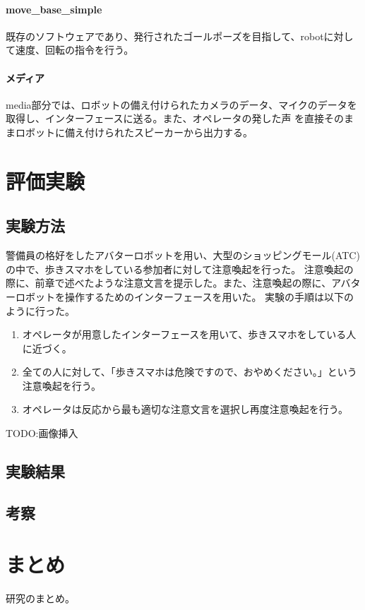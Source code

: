 \documentclass[11pt,a4j]{jreport}
\begin{document}
\subsubsection{move\_base\_simple}
既存のソフトウェアであり、発行されたゴールポーズを目指して、robotに対して速度、回転の指令を行う。

\subsubsection{メディア}
media部分では、ロボットの備え付けられたカメラのデータ、マイクのデータを取得し、インターフェースに送る。また、オペレータの発した声
を直接そのままロボットに備え付けられたスピーカーから出力する。


\chapter{評価実験}
\section{実験方法}
警備員の格好をしたアバターロボットを用い、大型のショッピングモール(ATC)の中で、歩きスマホをしている参加者に対して注意喚起を行った。
注意喚起の際に、前章で述べたような注意文言を提示した。また、注意喚起の際に、アバターロボットを操作するためのインターフェースを用いた。
実験の手順は以下のように行った。
\begin{enumerate}
  \item オペレータが用意したインターフェースを用いて、歩きスマホをしている人に近づく。
  \item 全ての人に対して、「歩きスマホは危険ですので、おやめください。」という注意喚起を行う。
  \item オペレータは反応から最も適切な注意文言を選択し再度注意喚起を行う。
\end{enumerate}
TODO:画像挿入
\section{実験結果}
\section{考察}

\chapter{まとめ}
研究のまとめ。

\end{document}
